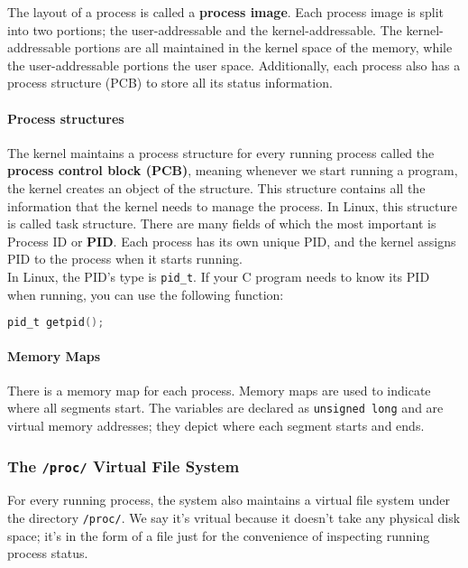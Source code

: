 \documentclass{article}
\newcommand{\bold}[1]{\textbf{#1}}
\newcommand{\code}[1]{\texttt{#1}}
\begin{document}
The layout of a process is called a \bold{process image}. Each process image is split into two portions; the user-addressable and the kernel-addressable. The kernel-addressable portions are all maintained in the kernel space of the memory, while the user-addressable portions the user space. Additionally, each process also has a process structure (PCB) to store all its status information. 

\paragraph{Process structures}

The kernel maintains a process structure for every running process called the \bold{process control block (PCB)}, meaning whenever we start running a program, the kernel creates an object of the structure. This structure contains all the information that the kernel needs to manage the process. In Linux, this structure is called task structure. There are many fields of which the most important is Process ID or \bold{PID}. Each process has its own unique PID, and the kernel assigns PID to the process when it starts running. \\

In Linux, the PID's type is \code{pid\_t}. If your C program needs to know its PID when running, you can use the following function: 

\begin{lstlisting}[language=C]
pid_t getpid();
\end{lstlisting}

\paragraph{Memory Maps}

There is a memory map for each process. Memory maps are used to indicate where all segments start. The variables are declared as \code{unsigned long} and are virtual memory addresses; they depict where each segment starts and ends. 

\subsubsection{The \code{/proc/} Virtual File System}

For every running process, the system also maintains a virtual file system under the directory \code{/proc/}. We say it's vritual because it doesn't take any physical disk space; it's in the form of a file just for the convenience of inspecting running process status. 
\end{document}

